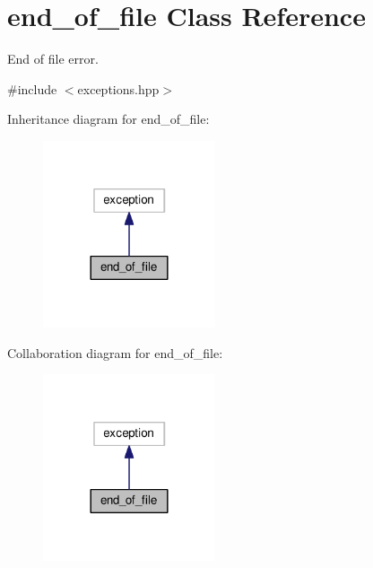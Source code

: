 \hypertarget{classend__of__file}{}\section{end\+\_\+of\+\_\+file Class Reference}
\label{classend__of__file}


End of file error.  




{\ttfamily \#include $<$exceptions.\+hpp$>$}



Inheritance diagram for end\+\_\+of\+\_\+file\+:\nopagebreak
\begin{figure}[H]
\begin{center}
\leavevmode
\includegraphics[width=144pt]{classend__of__file__inherit__graph}
\end{center}
\end{figure}


Collaboration diagram for end\+\_\+of\+\_\+file\+:\nopagebreak
\begin{figure}[H]
\begin{center}
\leavevmode
\includegraphics[width=144pt]{classend__of__file__coll__graph}
\end{center}
\end{figure}
